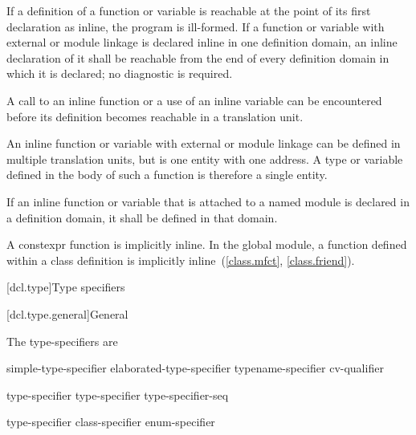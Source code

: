 \pnum
If a definition of a function or variable is reachable
at the point of its
first declaration as inline, the program is ill-formed. If a function or variable
with external or module linkage
is declared inline in one definition domain,
an inline declaration of it shall be reachable
from the end of every definition domain in which it is declared;
no diagnostic is required.
\begin{note}
A call to an inline function or a use of an inline variable can be encountered
before its definition becomes reachable in a translation unit.
\end{note}

\pnum
\begin{note}
An inline function or variable
with external or module linkage
can be defined in multiple translation units,
but is one entity with one address.
A type or  variable
defined in the body of such a function
is therefore a single entity.
\end{note}

\pnum
If an inline function or variable that is attached to a named module
is declared in a definition domain,
it shall be defined in that domain.
\begin{note}
A constexpr function is implicitly inline.
In the global module, a function defined within a class definition
is implicitly inline~(\ref{class.mfct}, \ref{class.friend}).
\end{note}

[dcl.type]{Type specifiers}%

[dcl.type.general]{General}%

\pnum
The type-specifiers are
%
%
%
\begin{bnf}
\br
  simple-type-specifier\br
  elaborated-type-specifier\br
  typename-specifier\br
  cv-qualifier
\end{bnf}

\begin{bnf}
\br
    type-specifier \br
    type-specifier type-specifier-seq
\end{bnf}

\begin{bnf}
\br
    type-specifier\br
    class-specifier\br
    enum-specifier
\end{bnf}


